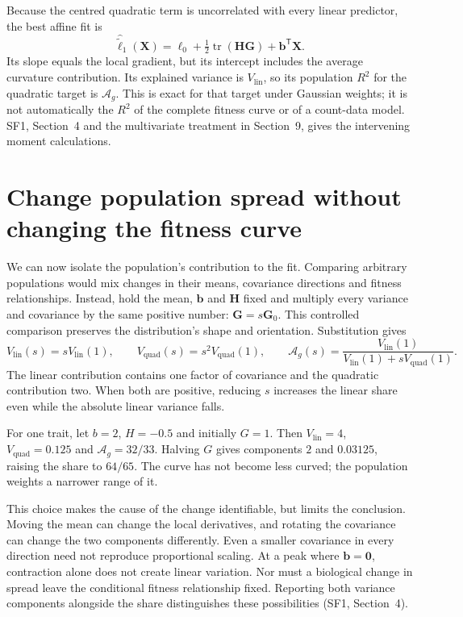 Because the centred quadratic term is uncorrelated with every linear
predictor, the best affine fit is
\begin{equation}
 \widehat{\widetilde\ell}_1(\mathbf X)
 =\ell_0+\tfrac12\operatorname{tr}(\mathbf H\mathbf G)
           +\mathbf b^{\mathsf T}\mathbf X.
 \label{companion:eq:affine}
\end{equation}
Its slope equals the local gradient, but its intercept includes the average
curvature contribution. Its explained variance is $V_{\mathrm{lin}}$, so
its population $R^2$ for the quadratic target is $\mathcal A_g$. This is
exact for that target under Gaussian weights; it is not automatically the
$R^2$ of the complete fitness curve or of a count-data model. SF1,
Section~4 and the multivariate treatment in Section~9, gives the intervening
moment calculations.

\section{Change population spread without changing the fitness curve}
\label{companion:scaling}

We can now isolate the population's contribution to the fit. Comparing
arbitrary populations would mix changes in their means, covariance
directions and fitness relationships. Instead, hold the mean, $\mathbf b$
and $\mathbf H$ fixed and multiply every variance and covariance by the
same positive number: $\mathbf G=s\mathbf G_0$. This controlled comparison
preserves the distribution's shape and orientation. Substitution gives
\begin{equation}
 V_{\mathrm{lin}}(s)=sV_{\mathrm{lin}}(1),
 \qquad
 V_{\mathrm{quad}}(s)=s^2V_{\mathrm{quad}}(1),
 \qquad
 \mathcal A_g(s)=\frac{V_{\mathrm{lin}}(1)}
 {V_{\mathrm{lin}}(1)+sV_{\mathrm{quad}}(1)}.
 \label{companion:eq:scaling}
\end{equation}
The linear contribution contains one factor of covariance and the
quadratic contribution two. When both are positive, reducing $s$ increases
the linear share even while the absolute linear variance falls.

For one trait, let $b=2$, $H=-0.5$ and initially $G=1$. Then
$V_{\mathrm{lin}}=4$, $V_{\mathrm{quad}}=0.125$ and
$\mathcal A_g=32/33$. Halving $G$ gives components $2$ and $0.03125$,
raising the share to $64/65$. The curve has not become less curved; the
population weights a narrower range of it.

This choice makes the cause of the change identifiable, but limits the
conclusion. Moving the mean can change the local derivatives, and rotating
the covariance can change the two components differently. Even a smaller
covariance in every direction need not reproduce proportional scaling.
At a peak where $\mathbf b=\mathbf0$, contraction alone does not create
linear variation. Nor must a biological change in spread leave the
conditional fitness relationship fixed. Reporting both variance components
alongside the share distinguishes these possibilities (SF1, Section~4).

